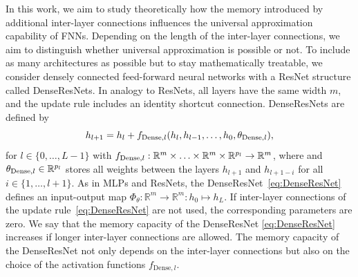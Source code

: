 \documentclass[10pt]{article}
\numberwithin{equation}{section}
\newcommand{\R}{\mathbb{R}}
\begin{document}
	In this work, we aim to study theoretically how the memory introduced by additional inter-layer connections influences the universal approximation capability of FNNs. Depending on the length of the inter-layer connections, we aim to distinguish whether universal approximation is possible or not. To include as many architectures as possible but to stay mathematically treatable, we consider densely connected feed-forward neural networks with a ResNet structure called DenseResNets. In analogy to ResNets, all layers have the same width $m$, and the update rule includes an identity shortcut connection. DenseResNets are defined by 
	\begin{equation}\label{eq:DenseResNet}
		h_{l+1} = h_{l} + f_{\textup{Dense},l}(h_{l}, h_{l-1}, \ldots, h_0, \theta_{\textup{Dense},l}), 
	\end{equation}
	for $l \in \{0,\ldots,L-1\}$ with $f_{\textup{Dense},l}: \mathbb{R}^{m} \times \ldots \times \mathbb{R}^m \times \mathbb{R}^{p_l} \rightarrow \mathbb{R}^m$, where and $\theta_{\textup{Dense},l} \in \mathbb{R}^{p_l}$ stores all weights between the layers $h_{l+1}$ and $h_{l+1-i}$ for all $i \in \{1,\ldots,l+1\}$. As in MLPs and ResNets, the DenseResNet~\eqref{eq:DenseResNet} defines an input-output map $\Phi_\theta: \R^m\rightarrow \R^m: h_0 \mapsto h_L$. If inter-layer connections of the update rule~\eqref{eq:DenseResNet} are not used, the corresponding parameters are zero. We say that the memory capacity of the DenseResNet \eqref{eq:DenseResNet} increases if longer inter-layer connections are allowed. The memory capacity of the DenseResNet not only depends on the inter-layer connections but also on the choice of the activation functions $f_{\text{Dense},l}$.
	
\end{document}
